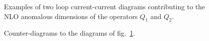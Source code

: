 \documentclass[12pt]{article}
\begin{document}
\begin{itemize}
\begin{itemize}
\begin{itemize}
\begin{figure}[hbt]
\vspace{0.10in}
\centerline{
\epsfysize=2in
}%
\vspace{0.08in}
\caption[]{Examples of two loop current-current diagrams
contributing to the NLO anomalous dimensions of the operators $Q_1$ and 
$Q_2$.
\label{L:5}}
\end{figure}

\begin{figure}[hbt]
\vspace{0.10in}
\centerline{
\epsfysize=2in
}%
\vspace{0.08in}
\caption[]{Counter-diagrams to the diagrams of fig.~\ref{L:5}.
\label{L:6}}
\end{figure}


\end{itemize}
\end{itemize}
\end{itemize}
\end{document}
